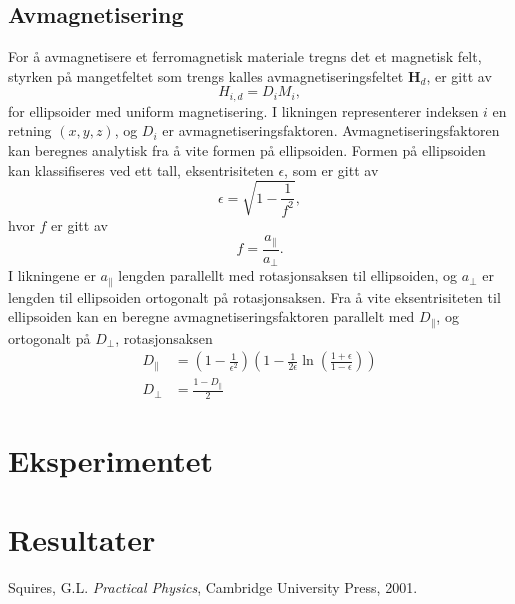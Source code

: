 \documentclass[%
 reprint,
 amsmath,amssymb,
 aps,
]{revtex4-1}
\begin{document}
\subsection{Avmagnetisering}
For å avmagnetisere et ferromagnetisk materiale tregns det et magnetisk felt, styrken på mangetfeltet som trengs kalles avmagnetiseringsfeltet $\bm{H}_d$, er gitt av
\begin{equation}
  H_{i, d} = D_iM_i,
\end{equation}
for ellipsoider med uniform magnetisering. I likningen representerer indeksen $i$ en retning $(x, y, z)$, og $D_i$ er avmagnetiseringsfaktoren. Avmagnetiseringsfaktoren kan beregnes analytisk fra å vite formen på ellipsoiden. Formen på ellipsoiden kan klassifiseres ved ett tall, eksentrisiteten $\epsilon$, som er gitt av
\begin{equation}
  \epsilon = \sqrt{1-\frac{1}{f^2}},
\end{equation}
hvor $f$ er gitt av
\begin{equation}
  f = \frac{a_{\parallel}}{a_{\perp}}.
\end{equation}
I likningene er $a_{\parallel}$ lengden parallellt med rotasjonsaksen til ellipsoiden, og $a_{\perp}$ er lengden til ellipsoiden ortogonalt på rotasjonsaksen. Fra å vite eksentrisiteten til ellipsoiden kan en beregne avmagnetiseringsfaktoren parallelt med $D_{\parallel}$, og ortogonalt på $D_{\perp}$, rotasjonsaksen
\begin{align}
  D_{\parallel} &= \left(1-\frac{1}{\epsilon^2}\right)\left(1-\frac{1}{2\epsilon}\ln{\left(\frac{1+\epsilon}{1-\epsilon}\right)} \right) \\
  D_{\perp} &= \frac{1-D_{\parallel}}{2}
\end{align}

\section{\label{sec:level2}Eksperimentet}
\section{\label{sec:level2}Resultater}



\begin{thebibliography}{9}


Squires, G.L. \emph{Practical Physics}, Cambridge University Press, 2001.



 \end{thebibliography}
\end{document}
